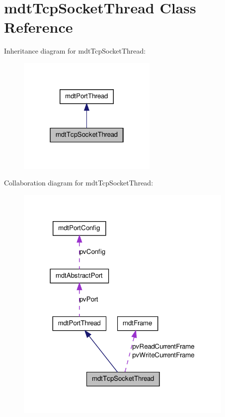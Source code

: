 \hypertarget{classmdt_tcp_socket_thread}{
\section{mdtTcpSocketThread Class Reference}
\label{classmdt_tcp_socket_thread}
}


Inheritance diagram for mdtTcpSocketThread:\nopagebreak
\begin{figure}[H]
\begin{center}
\leavevmode
\includegraphics[width=190pt]{classmdt_tcp_socket_thread__inherit__graph}
\end{center}
\end{figure}


Collaboration diagram for mdtTcpSocketThread:\nopagebreak
\begin{figure}[H]
\begin{center}
\leavevmode
\includegraphics[width=298pt]{classmdt_tcp_socket_thread__coll__graph}
\end{center}
\end{figure}

